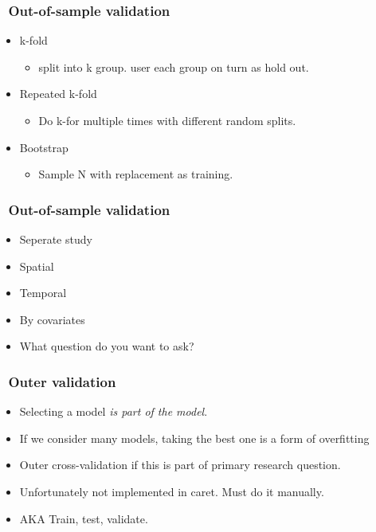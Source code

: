 \documentclass[handout, aspectratio = 169]{beamer}
\begin{document}
\begin{frame}
\frametitle{\insertframenumber~Out-of-sample validation}

\begin{itemize}
\item k-fold
\begin{itemize}
\item split into k group. user each group on turn as hold out.
\end{itemize}
\item Repeated k-fold
\begin{itemize}
\item Do k-for multiple times with different random splits.
\end{itemize}
\item Bootstrap
\begin{itemize}
\item Sample N with replacement as training.
\end{itemize}
\end{itemize}
\end{frame} 

\begin{frame}
\frametitle{\insertframenumber~Out-of-sample validation}

\begin{itemize}
\item Seperate study
\item Spatial
\item Temporal
\item By covariates
\item What question do you want to ask?
\end{itemize}
\end{frame} 


\begin{frame}
\frametitle{\insertframenumber~Outer validation}

\begin{itemize}
\item Selecting a model \emph{is part of the model}.
\item If we consider many models, taking the best one is a form of overfitting
\item Outer cross-validation if this is part of primary research question.
\item Unfortunately not implemented in caret. Must do it manually.
\item AKA Train, test, validate.
\end{itemize}
\end{frame} 
\end{document}
